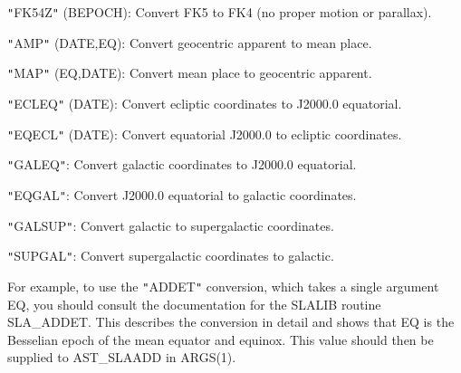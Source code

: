 \documentclass[twoside,11pt]{article}
\begin{document}
{{{         \sstitem
         {\tt{"}}FK54Z{\tt{"}} (BEPOCH): Convert FK5 to FK4 (no proper motion or parallax).

         \sstitem
         {\tt{"}}AMP{\tt{"}} (DATE,EQ): Convert geocentric apparent to mean place.

         \sstitem
         {\tt{"}}MAP{\tt{"}} (EQ,DATE): Convert mean place to geocentric apparent.

         \sstitem
         {\tt{"}}ECLEQ{\tt{"}} (DATE): Convert ecliptic coordinates to J2000.0 equatorial.

         \sstitem
         {\tt{"}}EQECL{\tt{"}} (DATE): Convert equatorial J2000.0 to ecliptic coordinates.

         \sstitem
         {\tt{"}}GALEQ{\tt{"}}: Convert galactic coordinates to J2000.0 equatorial.

         \sstitem
         {\tt{"}}EQGAL{\tt{"}}: Convert J2000.0 equatorial to galactic coordinates.

         \sstitem
         {\tt{"}}GALSUP{\tt{"}}: Convert galactic to supergalactic coordinates.

         \sstitem
         {\tt{"}}SUPGAL{\tt{"}}: Convert supergalactic coordinates to galactic.

      }
      For example, to use the {\tt{"}}ADDET{\tt{"}} conversion, which takes a single
      argument EQ, you should consult the documentation for the SLALIB
      routine SLA\_ADDET. This describes the conversion in detail and
      shows that EQ is the Besselian epoch of the mean equator and
      equinox.
      This value should then be supplied to AST\_SLAADD in ARGS(1).
   }
}
\end{document}
